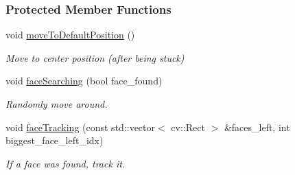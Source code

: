 \subsubsection*{Protected Member Functions}
\begin{DoxyCompactItemize}
\item 
void \hyperlink{group__faceTracker_a3e4e9e96b70d461306b5fce25fb4798c}{move\+To\+Default\+Position} ()
\begin{DoxyCompactList}\small\item\em Move to center position (after being stuck) \end{DoxyCompactList}\item 
void \hyperlink{group__faceTracker_a3e12158338ec0d4c06eb994a6afb65c3}{face\+Searching} (bool face\+\_\+found)
\begin{DoxyCompactList}\small\item\em Randomly move around. \end{DoxyCompactList}\item 
void \hyperlink{group__faceTracker_ae67c3501ac32d99ccf5cd53596472a1b}{face\+Tracking} (const std\+::vector$<$ cv\+::\+Rect $>$ \&faces\+\_\+left, int biggest\+\_\+face\+\_\+left\+\_\+idx)
\begin{DoxyCompactList}\small\item\em If a face was found, track it. \end{DoxyCompactList}\end{DoxyCompactItemize}
